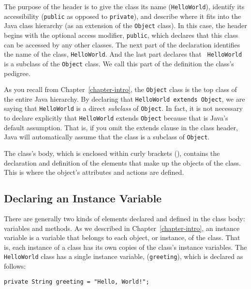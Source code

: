 \noindent The purpose of the header is to give the class its name 
({\tt HelloWorld}), identify its accessibility ({\tt public} as
opposed to {\tt private}), and describe where it fits into the Java class
hierarchy (as an extension of the {\tt Object} class). In this case,
the header begins with the optional access modifier, {\tt public},
which declares that this class can be accessed by any other
classes. The next part of the declaration identifies the name of the
class, {\tt HelloWorld}. And the last part declares that {\tt
HelloWorld} is a subclass of the {\tt Object} class. We call this
part of the definition the class's pedigree.

As you recall from Chapter~\ref{chapter-intro}, the {\tt Object} class is the top class
of the entire Java hierarchy. By declaring that {\tt HelloWorld
extends Object}, we are saying that {\tt HelloWorld} is a direct {\em
subclass} of {\tt Object}.  In fact, it is not necessary to declare
explicitly that {\tt HelloWorld} extends {\tt Object} because that is
Java's default assumption. That is, if you omit the extends clause in
the class header, Java will automatically assume that the class is a
subclass of {\tt Object}.

The class's body, which is enclosed within curly brackets ({}),
contains the declaration and definition of the elements that make up
the objects of the class.  This is where the object's attributes and
actions are defined. 

\subsection{Declaring an Instance Variable}
\label{subsec:vardecl}

There are generally two kinds of elements declared and defined in the
class body: variables and methods. As we described in Chapter~\ref{chapter-intro}, an
instance variable is a variable that belongs to each object, or
instance, of the class. That is, each instance of a class has its own
copies of the class's instance variables.  The {\tt HelloWorld} class
has a single instance variable, ({\tt greeting}), which is declared as
follows:

\begin{jjjlisting}
\begin{lstlisting}
private String greeting = "Hello, World!"; 
\end{lstlisting}
\end{jjjlisting}

